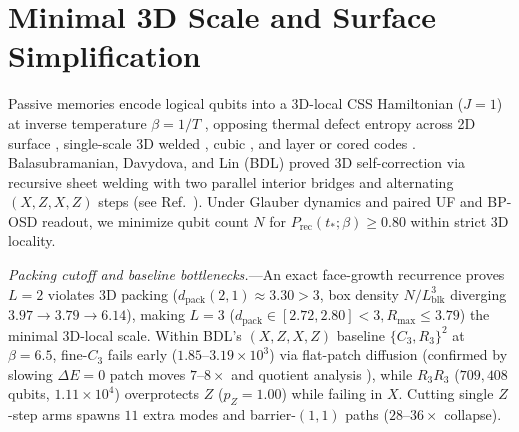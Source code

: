 \documentclass[aps,prx,reprint,superscriptaddress,nofootinbib,floatfix]{revtex4-2}
\begin{document}
\maketitle

\section{Minimal 3D Scale and Surface Simplification}

Passive memories encode logical qubits into a 3D-local CSS Hamiltonian ($J = 1$) at inverse temperature $\beta = 1/T$ \cite{bravyi_bb2024, quantumMemories, selfcorrecting4D, alicki4D}, opposing thermal defect entropy \cite{chesi2010, siva2017, bergamaschi2025mixing} across 2D surface \cite{selfcorrecting2D}, single-scale 3D welded \cite{michnicki2014}, cubic \cite{haah2011cubic, bravyi_haah2013, stengele2026haah}, and layer or cored codes \cite{layercodesyale, williamson2026layer, roberts2026cored}. Balasubramanian, Davydova, and Lin (BDL) \cite{selfcorrecting3D} proved 3D self-correction via recursive sheet welding with two parallel interior bridges and alternating $(X, Z, X, Z)$ steps (see Ref.~\cite{hayden2026}). Under Glauber dynamics \cite{davies1974, bkl1975} and paired UF \cite{delfosse_uf, delfosse_qldpc_uf} and BP-OSD \cite{panteleev_bposd, roffe_bposd2020} readout, we minimize qubit count $N$ for $P_{\mathrm{rec}}(t_*; \beta) \ge 0.80$ within strict 3D locality.

\emph{Packing cutoff and baseline bottlenecks.}---An exact face-growth recurrence proves $L = 2$ violates 3D packing ($d_{\mathrm{pack}}(2, 1) \approx 3.30 > 3$, box density $N/L_{\mathrm{blk}}^3$ diverging $3.97 \to 3.79 \to 6.14$), making $L = 3$ ($d_{\mathrm{pack}} \in [2.72, 2.80] < 3, R_{\max} \le 3.79$) the minimal 3D-local scale. Within BDL's $(X, Z, X, Z)$ baseline $\{C_3, R_3\}^2$ at $\beta = 6.5$, fine-$C_3$ fails early ($1.85\text{--}3.19 \times 10^3$) via flat-patch diffusion (confirmed by slowing $\Delta E = 0$ patch moves $7\text{--}8\times$ and quotient analysis \cite{metzner2009tpt, dorfler2011kron}), while $R_3 R_3$ ($709{,}408$ qubits, $1.11 \times 10^4$) overprotects $Z$ ($p_Z = 1.00$) while failing in $X$. Cutting single $Z$-step arms spawns $11$ extra modes \cite{poulin2005} and barrier-$(1, 1)$ paths ($28\text{--}36\times$ collapse).
\end{document}

